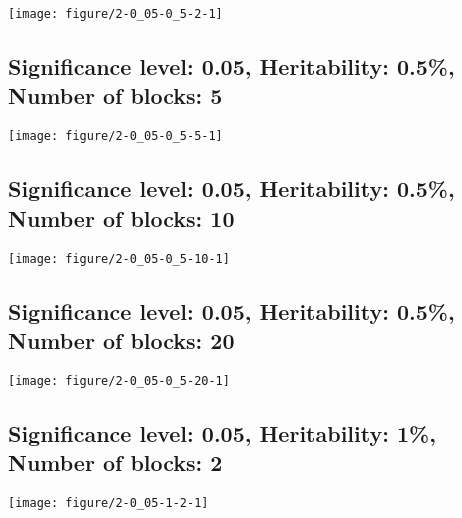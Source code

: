 \documentclass[11pt,letter]{article}\usepackage[]{graphicx}\usepackage[]{color}
\makeatletter
\def\maxwidth{ %
  \ifdim\Gin@nat@width>\linewidth
    \linewidth
  \else
    \Gin@nat@width
  \fi
}
\newenvironment{knitrout}{}{} %
\makeatother
\begin{document}
\begin{knitrout}
\color{fgcolor}
\texttt{[image: figure/2-0\_05-0\_5-2-1]} 

\end{knitrout}

\newpage
\subsection{Significance level: 0.05, Heritability: 0.5\%, Number of blocks: 5}

\begin{knitrout}
\color{fgcolor}
\texttt{[image: figure/2-0\_05-0\_5-5-1]} 

\end{knitrout}

\newpage
\subsection{Significance level: 0.05, Heritability: 0.5\%, Number of blocks: 10}

\begin{knitrout}
\color{fgcolor}
\texttt{[image: figure/2-0\_05-0\_5-10-1]} 

\end{knitrout}

\newpage
\subsection{Significance level: 0.05, Heritability: 0.5\%, Number of blocks: 20}

\begin{knitrout}
\color{fgcolor}
\texttt{[image: figure/2-0\_05-0\_5-20-1]} 

\end{knitrout}

\newpage
\subsection{Significance level: 0.05, Heritability: 1\%, Number of blocks: 2}

\begin{knitrout}
\color{fgcolor}
\texttt{[image: figure/2-0\_05-1-2-1]} 

\end{knitrout}
\end{document}
